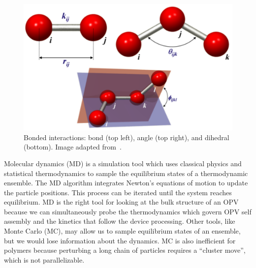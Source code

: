 \begin{figure}
    \centering
    \includegraphics[width=\linewidth]{images/bondangledihedral.pdf}
    \caption{Bonded interactions: bond (top left), angle (top right), and dihedral (bottom). Image adapted from~\cite{punma}.}\label{bad}
\end{figure}
Molecular dynamics (MD) is a simulation tool which uses classical physics and statistical thermodynamics to sample the equilibrium states of a thermodynamic ensemble.
The MD algorithm integrates Newton's equations of motion to update the particle positions.
This process can be iterated until the system reaches equilibrium.
MD is the right tool for looking at the bulk structure of an OPV because we can simultaneously probe the thermodynamics which govern OPV self assembly and the kinetics that follow the device processing.
Other tools, like Monte Carlo (MC), may allow us to sample equilibrium states of an ensemble, but we would lose information about the dynamics.
MC is also inefficient for polymers because perturbing a long chain of particles requires a ``cluster move'', which is not parallelizable.

